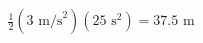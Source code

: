 \documentclass[preview]{standalone}
\begin{document}
\begin{align*}
\frac{1}{2} (3 \text{ m/s}^2) (25 \text{ s}^2) = 37.5 \text{ m}
\end{align*}
\end{document}
